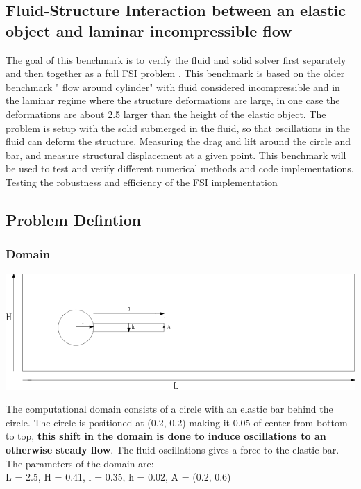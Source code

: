 \subsection{Fluid-Structure Interaction between an elastic object and laminar incompressible flow} \label{sec:HronTurek}
The goal of this benchmark is to verify the fluid and solid solver first separately and then together as a full FSI problem \cite{Hron2006a}. This benchmark is based on the older benchmark " flow around cylinder" with fluid considered incompressible and in the laminar regime where the structure deformations are large, in one case the deformations are about 2.5 larger than the height of the elastic object. The problem is setup with the solid submerged in the fluid, so that oscillations in the fluid can deform the structure. Measuring the drag and lift around the circle and bar, and measure structural displacement at a given point. This benchmark will be used to test and verify different numerical methods and code implementations. Testing the robustness and efficiency of the FSI implementation


\subsection*{Problem Defintion}
\subsubsection*{Domain}

\begin{center}
\includegraphics[scale=0.4]{./Verification_Validation/Hron_Turek/Domain_drawing.png}
\end{center}

The computational domain consists of a circle with an elastic bar behind the circle. The circle is positioned at (0.2, 0.2) making it 0.05 of center from bottom to top, \textbf{this shift in the domain is done to induce oscillations to an otherwise steady flow}. The fluid oscillations gives a force to the elastic bar. The parameters of the domain are:\\
L = 2.5, H = 0.41, l = 0.35, h = 0.02, A = (0.2, 0.6) \\

